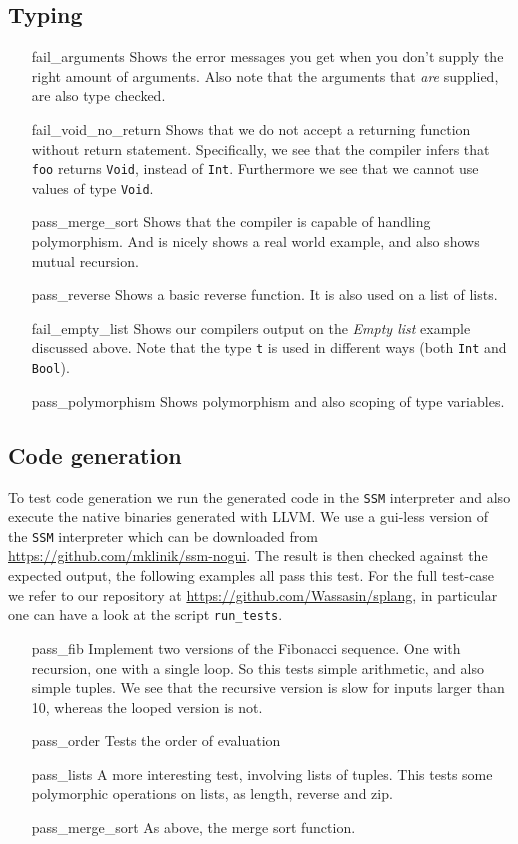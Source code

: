 \documentclass[11pt]{amsart}
\newcommand{\llvm}{\textsc{LLVM}\xspace}
\newcommand{\ssm}{\texttt{SSM}\xspace}
\begin{document}
\subsection{Typing}
\begin{itemize}
	\item[fail\_arguments] Shows the error messages you get when you don't supply the right amount of arguments. Also note that the arguments that \emph{are} supplied, are also type checked.
	\item[fail\_void\_no\_return] Shows that we do not accept a returning function without return statement. Specifically, we see that the compiler infers that \texttt{foo} returns \texttt{Void}, instead of \texttt{Int}. Furthermore we see that we cannot use values of type \texttt{Void}.
	\item[pass\_merge\_sort] Shows that the compiler is capable of handling polymorphism. And is nicely shows a real world example, and also shows mutual recursion.
	\item[pass\_reverse] Shows a basic reverse function. It is also used on a list of lists.
	\item[fail\_empty\_list] Shows our compilers output on the \emph{Empty list} example discussed above. Note that the type \texttt{t} is used in different ways (both \texttt{Int} and \texttt{Bool}).
	\item[pass\_polymorphism] Shows polymorphism and also scoping of type variables.
\end{itemize}

\subsection{Code generation}
To test code generation we run the generated code in the \ssm interpreter and also execute the native binaries generated with \llvm. We use a gui-less version of the \ssm interpreter which can be downloaded from \url{https://github.com/mklinik/ssm-nogui}. The result is then checked against the expected output, the following examples all pass this test. For the full test-case we refer to our repository at \url{https://github.com/Wassasin/splang}, in particular one can have a look at the script \texttt{run\_tests}.

\begin{itemize}
	\item[pass\_fib] Implement two versions of the Fibonacci sequence. One with recursion, one with a single loop. So this tests simple arithmetic, and also simple tuples. We see that the recursive version is slow for inputs larger than 10, whereas the looped version is not.
	\item[pass\_order] Tests the order of evaluation
	\item[pass\_lists] A more interesting test, involving lists of tuples. This tests some polymorphic operations on lists, as length, reverse and zip.
	\item[pass\_merge\_sort] As above, the merge sort function.
\end{itemize}
\end{document}
